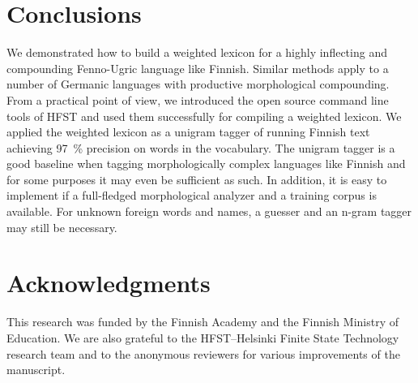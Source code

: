 \documentclass[a4paper]{article}
\begin{document}
\section{Conclusions}
\label{Sect8}

We demonstrated how to build a weighted lexicon for a highly
inflecting and compounding Fenno-Ugric language like Finnish. Similar
methods apply to a number of Germanic languages with productive
morphological compounding. From a practical point of view, we
introduced the open source command line tools of \textsc{HFST} and
used them successfully for compiling a weighted lexicon. We applied
the weighted lexicon as a unigram tagger of running Finnish text
achieving 97~\% precision on words in the vocabulary. The unigram
tagger is a good baseline when tagging morphologically complex
languages like Finnish and for some purposes it may even be sufficient
as such. In addition, it is easy to implement if a full-fledged
morphological analyzer and a training corpus is available. For unknown
foreign words and names, a guesser and an n-gram tagger may still be
necessary.

\section*{Acknowledgments}
This research was funded by the Finnish Academy and the Finnish
Ministry of Education. We are also grateful to the HFST--Helsinki
Finite State Technology research team and to the anonymous reviewers
for various improvements of the manuscript.


\end{document}
